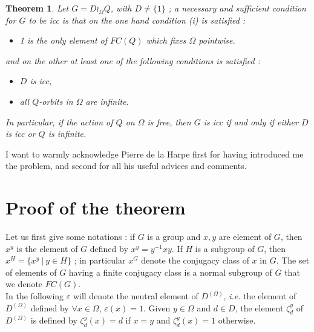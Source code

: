 \documentclass[12pt,oneside]{amsart}
\def\e{\varepsilon}
\newtheorem{theorem}{Theorem}
\begin{document}
\begin{theorem}
Let $G=D\wr_\Omega Q$, with $D\not=\{1\}$ ; a necessary and
sufficient condition for $G$  to be icc is that  on the one hand
condition (i) is satisfied :
\begin{itemize}
\item[\sl(i)]  1 is the only element of $FC(Q)$ which fixes $\Omega$
pointwise. \end{itemize}
 and on the other at least one of the
following conditions is satisfied :
\begin{itemize}
 \item[\sl(ii)] $D$ is icc,
 \item[\sl(iii)] all
$Q$-orbits in $\Omega$ are infinite.
\end{itemize}
In particular, if the action of $Q$ on $\Omega$ is free, then $G$
is icc if and only if either $D$ is icc or $Q$ is infinite.
\end{theorem}




I want to warmly acknowledge Pierre de la Harpe first for having
introduced me the problem, and second for all his useful advices
and
comments.\\


\section{Proof of the theorem}

Let us first give some notations : if $G$ is a group and $x,y$ are
element of $G$, then $x^y$ is the element of $G$ defined by
$x^y=y^{-1}xy$. If $H$ is a subgroup of $G$, then $x^H=\{x^y\ |\
y\in H\}$ ; in particular $x^G$ denote the conjugacy class of $x$
in $G$. The set of elements of $G$ having a finite conjugacy class
is a normal subgroup of $G$ that we denote $FC(G)$. \\







 In the following $\e$ will denote the
neutral element of $D^{(\Omega)}$, \emph{i.e.} the element of
$D^{(\Omega)}$ defined by $\forall x\in\Omega$, $\e(x)=1$. Given
$y\in \Omega$ and $d\in D$, the element $\zeta_d^y$ of
$D^{(\Omega)}$ is defined by $\zeta_d^y(x)=d$ if $x=y$ and
$\zeta_d^y(x)=1$ otherwise.

\end{document}
